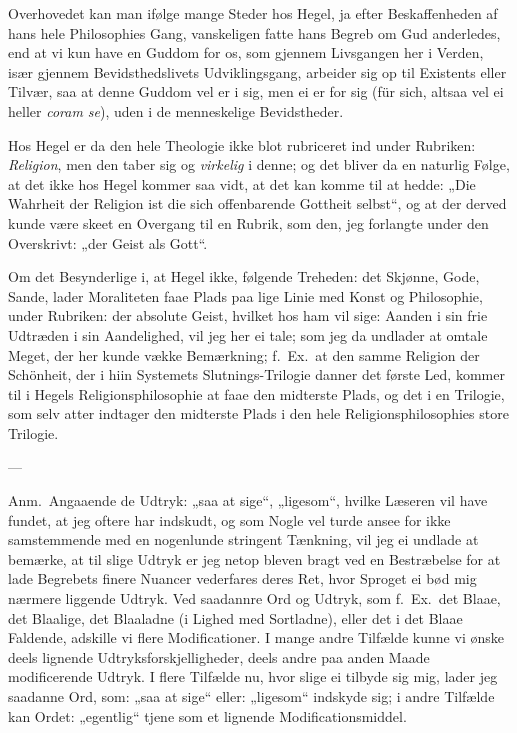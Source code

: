\documentclass[12pt,a4paper]{book}
\newcommand{\apage}[1]{\marginnote{\footnotesize\textit{[#1]}}}
\begin{document}
Overhovedet kan man ifølge mange Steder hos Hegel, ja efter Beskaffenheden af hans
hele Philosophies Gang, vanskeligen fatte hans Begreb om Gud anderledes, end at vi
kun have en Guddom for os, som gjennem Livsgangen her i Verden, især gjennem
Bevidsthedslivets Udviklingsgang, arbeider sig op til Existents eller Tilvær, saa
at denne Guddom vel er i sig, men ei er for sig (für sich, altsaa vel ei heller
\textit{coram se}), uden i de menneskelige Bevidstheder.

Hos Hegel er da den hele Theologie ikke blot rubriceret ind under Rubriken:
\emph{Religion}, men den taber sig og \emph{virkelig} i denne; og det bliver da en naturlig
Følge, at det ikke hos Hegel kommer saa vidt, at det kan komme til at hedde: „Die
Wahrheit der Religion ist die sich offenbarende Gottheit selbst“, og at der derved
kunde være skeet en Overgang til en Rubrik, som den, jeg forlangte under den
Overskrivt: „der Geist als Gott“.

Om det Besynderlige i, at Hegel ikke, følgende Treheden: det Skjønne, Gode, Sande,
lader Moraliteten faae Plads paa lige Linie med Konst og Philosophie, under
Rubriken: der absolute Geist, hvilket hos ham vil sige: Aanden i sin frie Udtræden
i sin Aandelighed, vil jeg her ei tale; som jeg da undlader at omtale Meget, der
her kunde vække Bemærkning; f.\ Ex.\ at den samme \apage{152} Religion der Schönheit, der i
hiin Systemets Slutnings-Trilogie danner det første Led, kommer til i Hegels
Religionsphilosophie at faae den midterste Plads, og det i en Trilogie, som selv
atter indtager den midterste Plads i den hele Religionsphilosophies store Trilogie.

\begin{center}---\end{center}

Anm.\ Angaaende de Udtryk: „saa at sige“, „ligesom“, hvilke Læseren vil have
fundet, at jeg oftere har indskudt, og som Nogle vel turde ansee for ikke
samstemmende med en nogenlunde stringent Tænkning, vil jeg ei undlade at bemærke,
at til slige Udtryk er jeg netop bleven bragt ved en Bestræbelse for at lade
Begrebets finere Nuancer vederfares deres Ret, hvor Sproget ei bød mig nærmere
liggende Udtryk. Ved saadannre Ord og Udtryk, som f.\ Ex.\ det Blaae, det
Blaalige, det Blaaladne (i Lighed med Sortladne), eller det i det Blaae Faldende,
adskille vi flere Modificationer. I mange andre Tilfælde kunne vi ønske deels
lignende Udtryksforskjelligheder, deels andre paa anden Maade modificerende Udtryk.
I flere Tilfælde nu, hvor slige ei tilbyde sig mig, lader jeg saadanne Ord, som:
„saa at sige“ eller: „ligesom“ indskyde sig; i andre Tilfælde kan Ordet:
„egentlig“ tjene som et lignende Modificationsmiddel.
\end{document}
